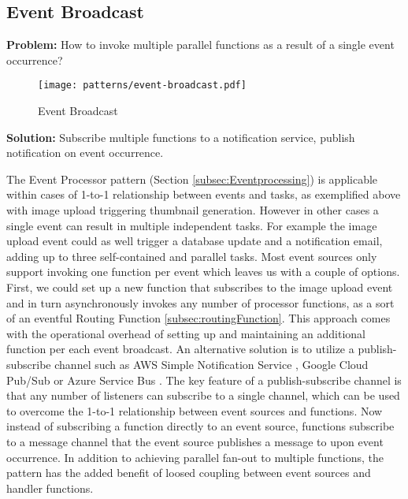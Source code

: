 \subsection{Event Broadcast} \label{subsec:EventBroadcast}

\textbf{Problem:} How to invoke multiple parallel functions as a result of a single event occurrence?

\begin{figure}[h]
  \centering
  \texttt{[image: patterns/event-broadcast.pdf]}
  \caption{Event Broadcast}
  \label{fig:eventBroadcast}
\end{figure}

\textbf{Solution:} Subscribe multiple functions to a notification service, publish notification on event occurrence.

The Event Processor pattern (Section \ref{subsec:Eventprocessing}) is applicable within cases of 1-to-1 relationship between events and tasks, as exemplified above with image upload triggering thumbnail generation. However in other cases a single event can result in multiple independent tasks. For example the image upload event could as well trigger a database update and a notification email, adding up to three self-contained and parallel tasks. Most event sources only support invoking one function per event which leaves us with a couple of options. First, we could set up a new function that subscribes to the image upload event and in turn asynchronously invokes any number of processor functions, as a sort of an eventful Routing Function \ref{subsec:routingFunction}. This approach comes with the operational overhead of setting up and maintaining an additional function per each event broadcast. An alternative solution is to utilize a publish-subscribe channel such as AWS Simple Notification Service \parencite{awslambda0218}, Google Cloud Pub/Sub \parencite{google18cloudFunctions} or Azure Service Bus \parencite{microsoft18azureFunctions}. The key feature of a publish-subscribe channel is that any number of listeners can subscribe to a single channel, which can be used to overcome the 1-to-1 relationship between event sources and functions. Now instead of subscribing a function directly to an event source, functions subscribe to a message channel that the event source publishes a message to upon event occurrence. In addition to achieving parallel fan-out to multiple functions, the pattern has the added benefit of loosed coupling between event sources and handler functions. \parencite{sbarski2017serverless}

